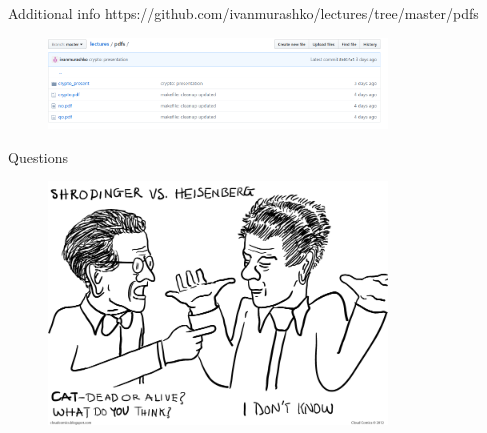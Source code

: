 \documentclass[10pt,pdf,hyperref={unicode}]{beamer}
\begin{document}
\begin{frame}{Additional info}
https://github.com/ivanmurashko/lectures/tree/master/pdfs
 \begin{figure} 
   \includegraphics[width=90mm,scale=0.5]{github.png}
  \end{figure}
\end{frame}

\begin{frame}{Questions}
 \begin{figure} 
   \includegraphics[width=90mm,scale=0.5]{questions.png}
  \end{figure}
\end{frame}
\end{document}
